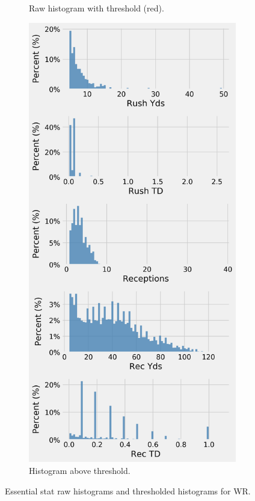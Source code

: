 \documentclass[12pt]{article}
\begin{document}
\begin{figure}[H]
\begin{subfigure}[b]{0.450\textwidth}
    \caption{Raw histogram with threshold (red).}
  \end{subfigure}
  \hfill
  \begin{subfigure}[b]{0.450\textwidth}
    \centering
    \includegraphics[width=1\textwidth]{../figures/threshold_hist_WR}
    \caption{Histogram above threshold.}
  \end{subfigure}
  \caption{Essential stat raw histograms and thresholded histograms for WR.}
\end{figure}
\end{document}
